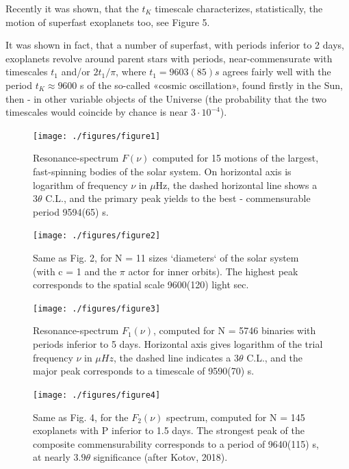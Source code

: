 \documentclass[twoside,draft]{article}
\begin{document}
\begin{sloppypar}
Recently it was shown, that the $t_K$ timescale characterizes, statistically, the motion of superfast exoplanets too, see Figure 5.

It was shown in fact, that a number of superfast, with periods inferior to 2 days, exoplanets revolve around parent stars with periods, near-commensurate with timescales $t_{1}$ and/or $2 t_{1}/\pi$, where $t_{1} = 9603(85) s$ agrees fairly well with the period $t_{K} \approx 9600$ s of the so-called «cosmic oscillation», found firstly in the Sun, then - in other variable objects of the Universe (the probability that the two timescales would coincide by chance is near $3 \cdot 10^{-4}$).

\begin{figure}
\centering
\texttt{[image: ./figures/figure1]}
\caption{Resonance-spectrum $F(\nu)$ computed for 15 motions of the largest, fast-spinning bodies of the solar system. On horizontal axis is logarithm of frequency $\nu$ in $\mu$Hz, the dashed horizontal line shows a $ 3 \theta $ C.L., and the primary peak yields to the best - commensurable period 9594(65) s.}
\label{fig:figure_label}
\end{figure}

\begin{figure}
\centering
\texttt{[image: ./figures/figure2]}
\caption{Same as Fig. 2, for N = 11 sizes `diameters` of the solar system (with c = 1 and the $\pi$ actor for inner orbits). The highest peak corresponds to the spatial scale 9600(120) light sec.}
\label{fig:figure_label}
\end{figure}

\begin{figure}
\centering
\texttt{[image: ./figures/figure3]}
\caption{Resonance-spectrum $F_{1} ( \nu)$, computed for N = 5746 binaries with periods inferior to 5 days. Horizontal axis gives logarithm of the trial frequency $\nu$ in $\mu Hz$, the dashed line indicates a $3 \theta$ C.L., and the major peak corresponds to a timescale of 9590(70) s.}
\label{fig:figure_label}
\end{figure}

\begin{figure}
\centering
\texttt{[image: ./figures/figure4]}
\caption{Same as Fig. 4, for the $F_{2} ( \nu )$ spectrum, computed for N = 145 exoplanets with P inferior to 1.5 days. The strongest peak of the composite commensurability corresponds to a period of 9640(115) s, at nearly $3.9\theta$ significance (after Kotov, 2018).}
\label{fig:figure_label}
\end{figure}


\end{sloppypar}
\end{document}
